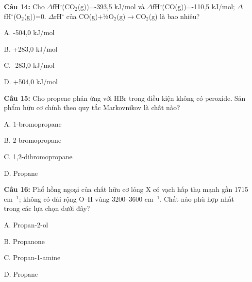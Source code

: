 \documentclass[12pt,a4paper]{article}
\begin{document}
\par\noindent\begin{minipage}{\linewidth}
\noindent\textbf{Câu 14:} Cho \(\Delta\)fH\(^{\circ}\)(CO$_{2}$(g))=-393,5 kJ/mol và \(\Delta\)fH\(^{\circ}\)(CO(g))=-110,5 kJ/mol; \(\Delta\)fH\(^{\circ}\)(O$_{2}$(g))=0. \(\Delta\)rH\(^{\circ}\) của CO(g)+½O$_{2}$(g)\(\rightarrow\)CO$_{2}$(g) là bao nhiêu?\par
\noindent A. -504,0 kJ/mol\par
\noindent B. +283,0 kJ/mol\par
\noindent C. -283,0 kJ/mol\par
\noindent D. +504,0 kJ/mol\par
\end{minipage}\par\vspace{0.12cm}

\par\noindent\begin{minipage}{\linewidth}
\noindent\textbf{Câu 15:} Cho propene phản ứng với HBr trong điều kiện không có peroxide. Sản phẩm hữu cơ chính theo quy tắc Markovnikov là chất nào?\par
\noindent A. 1-bromopropane\par
\noindent B. 2-bromopropane\par
\noindent C. 1,2-dibromopropane\par
\noindent D. Propane\par
\end{minipage}\par\vspace{0.12cm}

\par\noindent\begin{minipage}{\linewidth}
\noindent\textbf{Câu 16:} Phổ hồng ngoại của chất hữu cơ lỏng X có vạch hấp thụ mạnh gần 1715 cm$^{-1}$; không có dải rộng O--H vùng 3200--3600 cm$^{-1}$. Chất nào phù hợp nhất trong các lựa chọn dưới đây?\par
\noindent A. Propan-2-ol\par
\noindent B. Propanone\par
\noindent C. Propan-1-amine\par
\noindent D. Propane\par
\end{minipage}\par\vspace{0.12cm}
\end{document}
